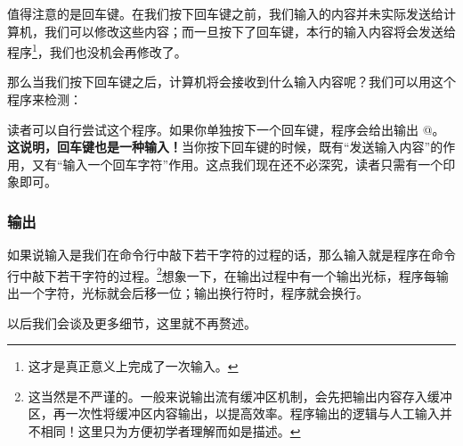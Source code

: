 值得注意的是回车键。在我们按下回车键之前，我们输入的内容并未实际发送给计算机，我们可以修改这些内容；而一旦按下了回车键，本行的输入内容将会发送给程序\footnote{这才是真正意义上完成了一次输入。}，我们也没机会再修改了。\par
那么当我们按下回车键之后，计算机将会接收到什么输入内容呢？我们可以用这个程序来检测：
\par
读者可以自行尝试这个程序。如果你单独按下一个回车键，程序会给出输出 @。\textbf{这说明，回车键也是一种输入！}当你按下回车键的时候，既有``发送输入内容''的作用，又有``输入一个回车字符''作用。这点我们现在还不必深究，读者只需有一个印象即可。\par
\subsubsection*{输出}
如果说输入是我们在命令行中敲下若干字符的过程的话，那么输入就是程序在命令行中敲下若干字符的过程。\footnote{这当然是不严谨的。一般来说输出流有缓冲区机制，会先把输出内容存入缓冲区，再一次性将缓冲区内容输出，以提高效率。程序输出的逻辑与人工输入并不相同！这里只为方便初学者理解而如是描述。}想象一下，在输出过程中有一个输出光标，程序每输出一个字符，光标就会后移一位；输出换行符时，程序就会换行。\par
以后我们会谈及更多细节，这里就不再赘述。\par
